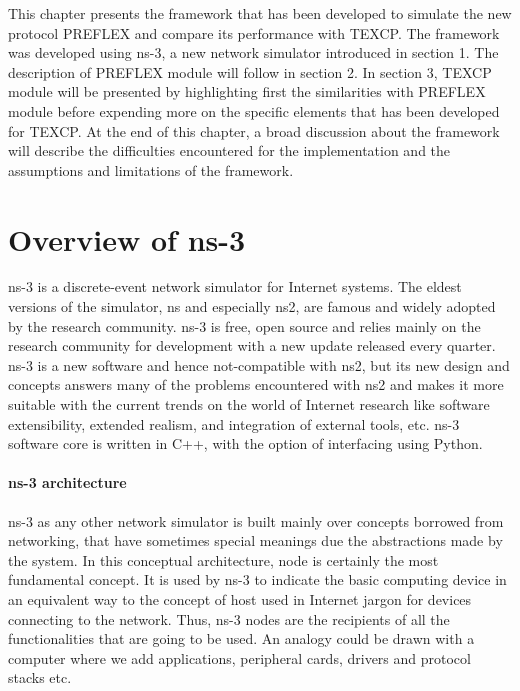 This chapter presents the framework that has been developed to simulate the new protocol PREFLEX and compare its performance with TEXCP. The framework was developed using ns-3, a new network simulator introduced in section 1. The description of PREFLEX module will follow in section 2. In section 3, TEXCP module will be presented by highlighting first the similarities with PREFLEX module before expending more on the specific elements that has been developed for TEXCP. At the end of this chapter, a broad discussion about the framework will describe the difficulties encountered for the implementation and the assumptions and limitations of the framework.

\section{Overview of ns-3}

ns-3 is a discrete-event network simulator for Internet systems. The eldest versions of the simulator, ns and especially ns2, are famous and widely adopted by the research community.  ns-3  is free, open source and relies mainly on the research community for development with a new update released every quarter. ns-3 is a new software and hence not-compatible with ns2, but its new design and concepts answers many of the problems encountered with ns2 and makes it more suitable with the current trends on the world of Internet research like software extensibility, extended realism, and integration of external tools, etc.  ns-3 software core is written in C++, with the option of interfacing using Python. 

\paragraph{ns-3 architecture}

ns-3 as any other network simulator is built mainly over concepts borrowed from networking, that  have sometimes special meanings due the abstractions made by the system. In this conceptual architecture, node is certainly the most fundamental concept. It is used by ns-3 to indicate the basic computing device in an  equivalent way to the concept of host used in Internet jargon for devices connecting to the network. Thus, ns-3 nodes are the recipients of all the functionalities that are going to be used. An analogy could be drawn with a computer where we add applications, peripheral cards, drivers and protocol stacks etc. 

